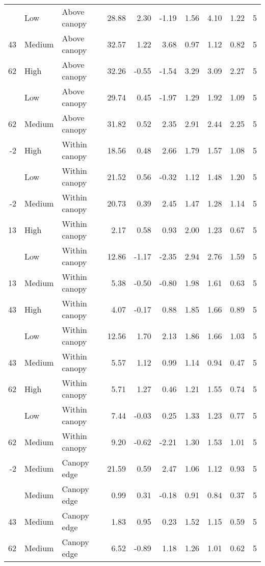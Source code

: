 \documentclass[10pt,]{article}
\begin{document}
\begin{longtable}{rllrrrrrrr}
\addlinespace
43 & Low & Above canopy & 28.88 & 2.30 & -1.19 & 1.56 & 4.10 & 1.22 & 5\\
43 & Medium & Above canopy & 32.57 & 1.22 & 3.68 & 0.97 & 1.12 & 0.82 & 5\\
62 & High & Above canopy & 32.26 & -0.55 & -1.54 & 3.29 & 3.09 & 2.27 & 5\\
\addlinespace
62 & Low & Above canopy & 29.74 & 0.45 & -1.97 & 1.29 & 1.92 & 1.09 & 5\\
62 & Medium & Above canopy & 31.82 & 0.52 & 2.35 & 2.91 & 2.44 & 2.25 & 5\\
-2 & High & Within canopy & 18.56 & 0.48 & 2.66 & 1.79 & 1.57 & 1.08 & 5\\
\addlinespace
-2 & Low & Within canopy & 21.52 & 0.56 & -0.32 & 1.12 & 1.48 & 1.20 & 5\\
-2 & Medium & Within canopy & 20.73 & 0.39 & 2.45 & 1.47 & 1.28 & 1.14 & 5\\
13 & High & Within canopy & 2.17 & 0.58 & 0.93 & 2.00 & 1.23 & 0.67 & 5\\
\addlinespace
13 & Low & Within canopy & 12.86 & -1.17 & -2.35 & 2.94 & 2.76 & 1.59 & 5\\
13 & Medium & Within canopy & 5.38 & -0.50 & -0.80 & 1.98 & 1.61 & 0.63 & 5\\
43 & High & Within canopy & 4.07 & -0.17 & 0.88 & 1.85 & 1.66 & 0.89 & 5\\
\addlinespace
43 & Low & Within canopy & 12.56 & 1.70 & 2.13 & 1.86 & 1.66 & 1.03 & 5\\
43 & Medium & Within canopy & 5.57 & 1.12 & 0.99 & 1.14 & 0.94 & 0.47 & 5\\
62 & High & Within canopy & 5.71 & 1.27 & 0.46 & 1.21 & 1.55 & 0.74 & 5\\
\addlinespace
62 & Low & Within canopy & 7.44 & -0.03 & 0.25 & 1.33 & 1.23 & 0.77 & 5\\
62 & Medium & Within canopy & 9.20 & -0.62 & -2.21 & 1.30 & 1.53 & 1.01 & 5\\
-2 & Medium & Canopy edge & 21.59 & 0.59 & 2.47 & 1.06 & 1.12 & 0.93 & 5\\
\addlinespace
13 & Medium & Canopy edge & 0.99 & 0.31 & -0.18 & 0.91 & 0.84 & 0.37 & 5\\
43 & Medium & Canopy edge & 1.83 & 0.95 & 0.23 & 1.52 & 1.15 & 0.59 & 5\\
62 & Medium & Canopy edge & 6.52 & -0.89 & 1.18 & 1.26 & 1.01 & 0.62 & 5\\*
\end{longtable}\endgroup{}
\end{document}

